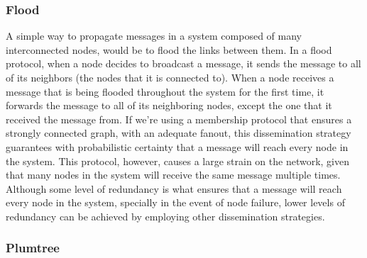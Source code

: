 \documentclass[sigconf]{acmart}
\begin{document}
\subsubsection{Flood} 

A simple way to propagate messages in a system composed of many interconnected nodes, would be to flood the links between them. In a flood protocol, when a node decides to broadcast a message, it sends the message to all of its neighbors (the nodes that it is connected to). When a node receives a message that is being flooded throughout the system for the first time, it forwards the message to all of its neighboring nodes, except the one that it received the message from.
If we're using a membership protocol that ensures a strongly connected graph, with an adequate fanout, this dissemination strategy guarantees with probabilistic certainty that a message will reach every node in the system. 
This protocol, however, causes a large strain on the network, given that many nodes in the system will receive the same message multiple times. Although some level of redundancy is what ensures that a message will reach every node in the system, specially in the event of node failure, lower levels of redundancy can be achieved by employing other dissemination strategies.

\subsubsection{Plumtree}
\end{document}
